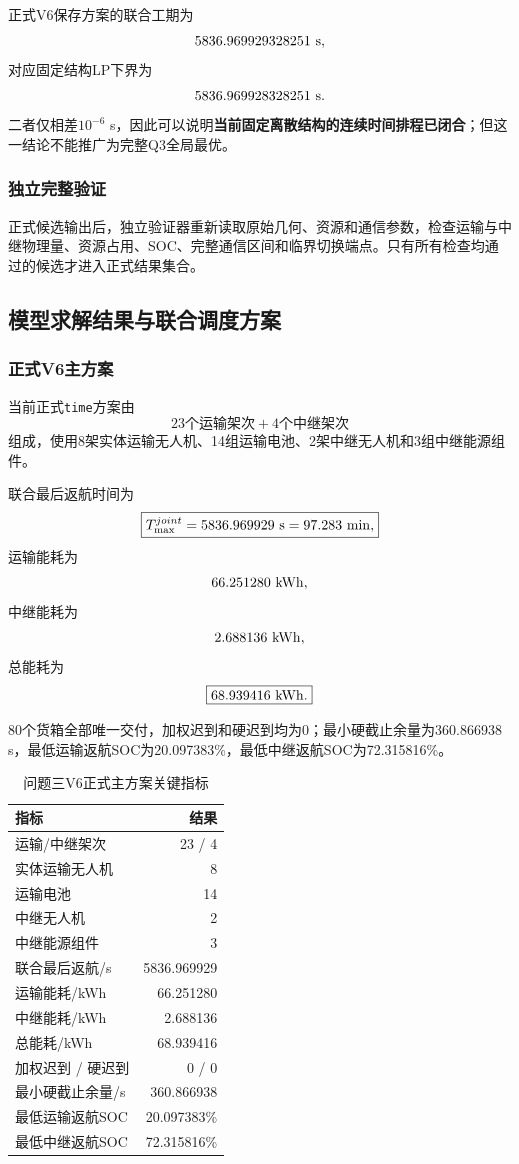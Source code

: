 \documentclass[UTF8,a4paper,12pt]{ctexart}
\begin{document}
正式V6保存方案的联合工期为
\[
5836.969929328251\ {\rm s},
\]
对应固定结构LP下界为
\[
5836.969928328251\ {\rm s}.
\]
二者仅相差$10^{-6}$ s，因此可以说明\textbf{当前固定离散结构的连续时间排程已闭合}；但这一结论不能推广为完整Q3全局最优。

\subsubsection{独立完整验证}

正式候选输出后，独立验证器重新读取原始几何、资源和通信参数，检查运输与中继物理量、资源占用、SOC、完整通信区间和临界切换端点。只有所有检查均通过的候选才进入正式结果集合。

\subsection{模型求解结果与联合调度方案}

\subsubsection{正式V6主方案}

当前正式\texttt{time}方案由
\[
\boxed{
23\text{个运输架次}
+
4\text{个中继架次}
}
\]
组成，使用8架实体运输无人机、14组运输电池、2架中继无人机和3组中继能源组件。

联合最后返航时间为
\[
\boxed{
T_{\max}^{joint}
=
5836.969929\ {\rm s}
=
97.283\ {\rm min},
}
\]
运输能耗为
\[
66.251280\ {\rm kWh},
\]
中继能耗为
\[
2.688136\ {\rm kWh},
\]
总能耗为
\[
\boxed{
68.939416\ {\rm kWh}.
}
\]

80个货箱全部唯一交付，加权迟到和硬迟到均为0；最小硬截止余量为360.866938 s，最低运输返航SOC为20.097383\%，最低中继返航SOC为72.315816\%。

\begin{table}[H]
\centering
\caption{问题三V6正式主方案关键指标}
\label{tab:q3_v6_metrics}
\begin{tabular}{lr}
\toprule
指标 & 结果\\
\midrule
运输/中继架次 & 23 / 4\\
实体运输无人机 & 8\\
运输电池 & 14\\
中继无人机 & 2\\
中继能源组件 & 3\\
联合最后返航/s & 5836.969929\\
运输能耗/kWh & 66.251280\\
中继能耗/kWh & 2.688136\\
总能耗/kWh & 68.939416\\
加权迟到 / 硬迟到 & 0 / 0\\
最小硬截止余量/s & 360.866938\\
最低运输返航SOC & 20.097383\%\\
最低中继返航SOC & 72.315816\%\\
\bottomrule
\end{tabular}
\end{table}
\end{document}

